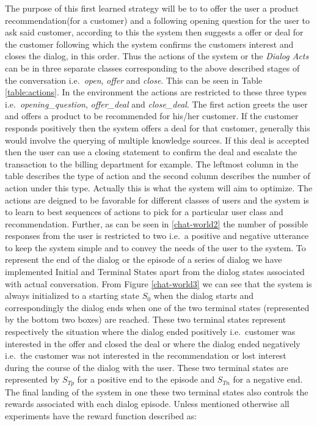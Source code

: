 \documentclass[14pt]{extarticle}
\numberwithin{equation}{section}
\begin{document}
The purpose of this first learned strategy will be to to offer the user a product recommendation(for a customer) and a following opening question for the user to ask said customer, according to this the system then suggests a offer or deal for the customer following which the system confirms the customers interest and closes the dialog, in this order. Thus the actions of the system or the \textit{Dialog Acts} can be in three separate classes corresponding to the above described stages of the conversation i.e.\  \textit{open}, \textit{offer} and \textit{close}. This can be seen in Table \ref{table:actions}. In the environment the actions are restricted to these three types i.e.\ \textit{opening\_question}, \textit{offer\_deal} and \textit{close\_deal}. The first action greets the user and offers a product to be recommended for his/her customer. If the customer responds positively then the system offers a deal for that customer, generally this would involve the querying of multiple knowledge sources. If this deal is accepted then the user can use a closing statement to confirm the deal and escalate the transaction to the billing department for example. The leftmost column in the table describes the type of action and the second column describes the number of action under this type. Actually this is what the system will aim to optimize. The actions are deigned to be favorable for different classes of users and the system is to learn to best sequences of actions to pick for a particular user class and recommendation.
 Further, as can be seen in \ref{chat-world2} the number of possible responses from the user is restricted to two i.e.\ a positive and negative utterance to keep the system simple and to convey the needs of the user to the system. To represent the end of the dialog or the episode of a series of dialog we have implemented Initial and Terminal States apart from the dialog states associated with actual conversation. From Figure \ref{chat-world3} we can see that the system is always initialized to a starting state $S_0$ when the dialog starts and correspondingly the dialog ends when one of the two terminal states (represented by the bottom two boxes) are reached. These two terminal states represent respectively the situation where the dialog ended positively i.e.\ customer was interested in the offer and closed the deal or where the dialog ended negatively i.e.\ the customer was not interested in the recommendation or lost interest during the course of the dialog with the user. These two terminal states are represented by $S_{Tp}$ for a positive end to the episode and $S_{Tn}$ for a negative end. The final landing of the system in one these two terminal states also controls the rewards associated with each dialog episode. Unless mentioned otherwise all experiments have the reward function described as:
\end{document}
